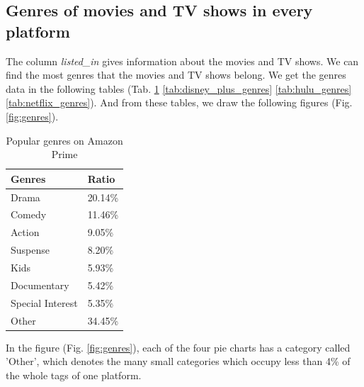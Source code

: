 \documentclass{article}
\begin{document}
\subsection{Genres of movies and TV shows in every platform}

The column {\it listed\_in} gives information about the movies and TV shows. 
We can find the most genres that the movies and TV shows belong. We get the genres 
data in the following tables (Tab. \ref{tab:amazon_prime_genres}
\ref{tab:disney_plus_genres} \ref{tab:hulu_genres} \ref{tab:netflix_genres}). And 
from these tables, we draw the following figures (Fig. \ref{fig:genres}).
\begin{table}[!htb]
	\centering
	\caption{Popular genres on Amazon Prime}
	\label{tab:amazon_prime_genres}
	\begin{tabular}{@{}ll@{}}
	\toprule
	Genres           & Ratio   \\ \midrule
	Drama            & 20.14\% \\
	Comedy           & 11.46\% \\
	Action           & 9.05\%  \\
	Suspense         & 8.20\%  \\
	Kids             & 5.93\%  \\
	Documentary      & 5.42\%  \\
	Special Interest & 5.35\%  \\
	Other            & 34.45\% \\ \bottomrule
	\end{tabular}
\end{table}

In the figure (Fig. \ref{fig:genres}), each of the four pie charts has a category 
called 'Other', which denotes the many small categories which occupy less than 4\% 
of the whole tags of one platform.
\end{document}
